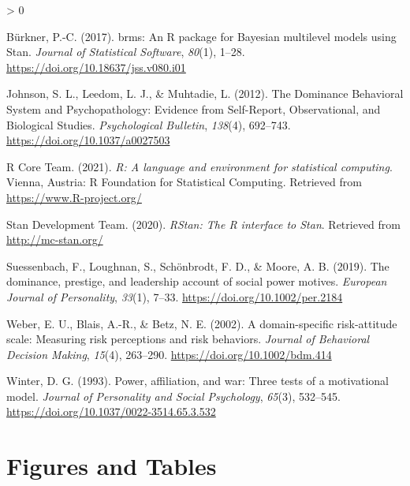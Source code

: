 \documentclass[
  english,
  man]{apa6}
\newlength{\cslhangindent}
\newenvironment{CSLReferences}[2] %
 {%
  \setlength{\parindent}{0pt}
  \ifodd #1 \everypar{\setlength{\hangindent}{\cslhangindent}}\ignorespaces\fi
  \ifnum #2 > 0
  \setlength{\parskip}{#2\baselineskip}
  \fi
 }%
 {}
\begin{document}
\hypertarget{refs}{}
\begin{CSLReferences}{1}{0}
\leavevmode\hypertarget{ref-brms-2021}{}%
Bürkner, P.-C. (2017). {brms}: An {R} package for {Bayesian} multilevel models using {Stan}. \emph{Journal of Statistical Software}, \emph{80}(1), 1--28. \url{https://doi.org/10.18637/jss.v080.i01}

\leavevmode\hypertarget{ref-johnson_dominance_2012}{}%
Johnson, S. L., Leedom, L. J., \& Muhtadie, L. (2012). The {Dominance} {Behavioral} {System} and {Psychopathology}: {Evidence} from {Self}-{Report}, {Observational}, and {Biological} {Studies}. \emph{Psychological Bulletin}, \emph{138}(4), 692--743. \url{https://doi.org/10.1037/a0027503}

\leavevmode\hypertarget{ref-R-base}{}%
R Core Team. (2021). \emph{R: A language and environment for statistical computing}. Vienna, Austria: R Foundation for Statistical Computing. Retrieved from \url{https://www.R-project.org/}

\leavevmode\hypertarget{ref-rStan}{}%
Stan Development Team. (2020). \emph{{RStan}: The {R} interface to {Stan}}. Retrieved from \url{http://mc-stan.org/}

\leavevmode\hypertarget{ref-suessenbach_dominance_2019}{}%
Suessenbach, F., Loughnan, S., Schönbrodt, F. D., \& Moore, A. B. (2019). The dominance, prestige, and leadership account of social power motives. \emph{European Journal of Personality}, \emph{33}(1), 7--33. \url{https://doi.org/10.1002/per.2184}

\leavevmode\hypertarget{ref-weber_domain-specific_2002}{}%
Weber, E. U., Blais, A.-R., \& Betz, N. E. (2002). A domain-specific risk-attitude scale: Measuring risk perceptions and risk behaviors. \emph{Journal of Behavioral Decision Making}, \emph{15}(4), 263--290. \url{https://doi.org/10.1002/bdm.414}

\leavevmode\hypertarget{ref-winter_power_1993}{}%
Winter, D. G. (1993). Power, affiliation, and war: {Three} tests of a motivational model. \emph{Journal of Personality and Social Psychology}, \emph{65}(3), 532--545. \url{https://doi.org/10.1037/0022-3514.65.3.532}

\end{CSLReferences}

\endgroup

\newpage

\hypertarget{figures-and-tables}{%
\section{Figures and Tables}\label{figures-and-tables}}
\end{document}

